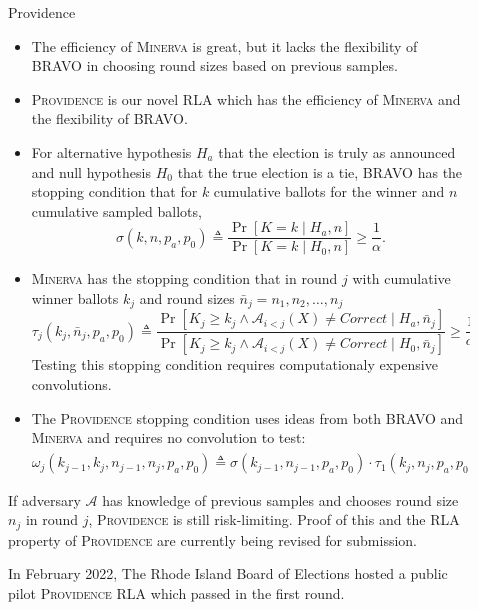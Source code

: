 \documentclass[final]{beamer}
\newcommand{\Minerva}{\textsc{Minerva}\xspace}
\newcommand{\Prov}{\textsc{Providence}\xspace}
\newcommand{\BRAVO}{\textsc{BRAVO}\xspace}
\newlength{\sepwidth}
\newlength{\colwidth}
\newcommand{\separatorcolumn}{\begin{column}{\sepwidth}\end{column}}
\begin{document}
\begin{frame}[t]
\begin{columns}[t]
\begin{column}{\colwidth}
\end{column}

\separatorcolumn

\begin{column}{\colwidth}
\begin{block}{Providence}

\begin{itemize}
\item
The efficiency of \Minerva is great, but it lacks the flexibility of \BRAVO in choosing round sizes based on previous samples.
\item
\Prov is our novel RLA which has the efficiency of \Minerva and the flexibility of \BRAVO.
\item For alternative hypothesis $H_a$ that the election is truly as announced and null
hypothesis $H_0$ that the true election is a tie, \BRAVO has the stopping condition that
for $k$ cumulative ballots for the winner and $n$ cumulative sampled ballots,
$$\sigma(k,n,p_a,p_0) \triangleq \frac{\Pr[K=k\mid H_a, n]}{\Pr[K=k\mid H_0, n]}\ge \frac{1}{\alpha}.$$
\item \Minerva has the stopping condition that in round $j$ with cumulative winner ballots $k_j$ and round sizes $\bar n_j = n_1,n_2,\ldots,n_j$
$$\tau_j(k_j,\bar n_j,p_a,p_0) \triangleq \frac{\Pr[K_j\ge k_j \wedge \mathcal{A}_{i<j}(X)\neq Correct \mid H_a, \bar n_j]}{\Pr[K_j\ge k_j \wedge \mathcal{A}_{i<j}(X)\neq Correct \mid H_0, \bar n_j]}\ge \frac{1}{\alpha}.$$ Testing this stopping condition requires computationaly expensive convolutions.
\item The \Prov stopping condition uses ideas from both \BRAVO and \Minerva and requires no convolution to test:
$$\omega_j(k_{j-1},k_j,n_{j-1},n_j,p_a,p_0)\triangleq \sigma(k_{j-1},n_{j-1},p_a,p_0)\cdot \tau_1(k_j,n_j,p_a,p_0) \ge \frac{1}{\alpha}.$$ 

\end{itemize}

If adversary $\mathcal{A}$ has knowledge of previous samples and chooses round size $n_j$ in round $j$, 
\Prov is still risk-limiting. Proof of this and the RLA property of \Prov are currently being revised for submission.

\heading {\Prov pilot}
In February 2022, The Rhode Island Board of Elections hosted a public pilot \Prov RLA which passed 
in the first round.


\end{block}
\end{column}
\end{columns}
\end{frame}
\end{document}
